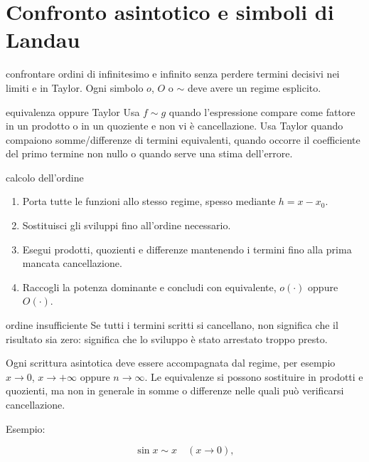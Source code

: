 \chapter{Confronto asintotico e simboli di Landau}
\label{chap:9}

\begin{obiettivocapitolo}{confrontare ordini di infinitesimo e infinito senza perdere termini decisivi}
\prioritaalta nei limiti e in Taylor. Ogni simbolo $o$, $O$ o $\sim$ deve avere un regime esplicito.
\end{obiettivocapitolo}
\begin{sceltametodo}{equivalenza oppure Taylor}
Usa $f\sim g$ quando l'espressione compare come fattore in un prodotto o in un quoziente e non vi è cancellazione. Usa Taylor quando compaiono somme/differenze di termini equivalenti, quando occorre il coefficiente del primo termine non nullo o quando serve una stima dell'errore.
\end{sceltametodo}
\begin{proceduraesame}{calcolo dell'ordine}
\begin{enumerate}
\item Porta tutte le funzioni allo stesso regime, spesso mediante $h=x-x_0$.
\item Sostituisci gli sviluppi fino all'ordine necessario.
\item Esegui prodotti, quozienti e differenze mantenendo i termini fino alla prima mancata cancellazione.
\item Raccogli la potenza dominante e concludi con equivalente, $o(\cdot)$ oppure $O(\cdot)$.
\end{enumerate}
\end{proceduraesame}
\begin{errorefrequente}{ordine insufficiente}
Se tutti i termini scritti si cancellano, non significa che il risultato sia zero: significa che lo sviluppo è stato arrestato troppo presto.
\end{errorefrequente}

Ogni scrittura asintotica deve essere accompagnata dal regime, per esempio \(x\to0\), \(x\to+\infty\) oppure \(n\to\infty\). Le equivalenze si possono sostituire in prodotti e quozienti, ma non in generale in somme o differenze nelle quali può verificarsi cancellazione.

Esempio:

\[
\sin x\sim x\quad(x\to0),
\]

